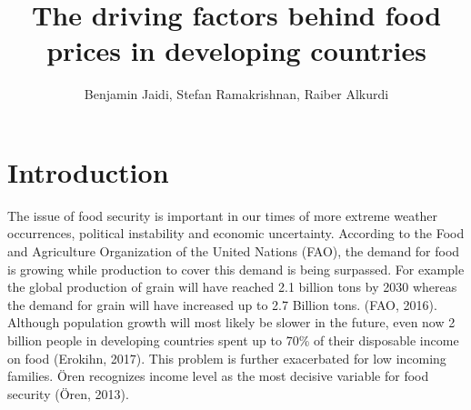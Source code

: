 \documentclass[12pt,a4paper,english]{article}
\title{The driving factors behind food prices in developing countries}
\author{Benjamin Jaidi\inst{1}, Stefan Ramakrishnan\inst{1}, Raiber Alkurdi\inst{1} }
\begin{document}
 

\maketitle
 

\tableofcontents
\newpage

\section{Introduction}

The issue of food security is important in our times of more extreme weather occurrences, political instability and economic uncertainty. According to the Food and Agriculture Organization of the United Nations (FAO), the demand for food is growing while production to cover this demand is being surpassed. For example the global production of grain will have reached 2.1 billion  tons by 2030 whereas the demand for grain will have increased up to 2.7 Billion tons. (FAO, 2016). Although population growth will most likely be slower in the future, even now 2 billion people in developing countries spent up to 70\% of their disposable income on food (Erokihn, 2017). This problem is further exacerbated for low incoming families. {\"O}ren recognizes income level as the most decisive variable for food security ({\"O}ren, 2013).
\end{document}
